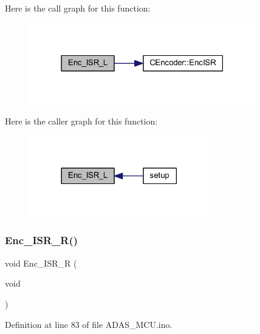 Here is the call graph for this function\+:
\nopagebreak
\begin{figure}[H]
\begin{center}
\leavevmode
\includegraphics[width=279pt]{_a_d_a_s___m_c_u_8ino_a89c135c3ad9390c0a5c08c78a9c985d1_cgraph}
\end{center}
\end{figure}
Here is the caller graph for this function\+:
\nopagebreak
\begin{figure}[H]
\begin{center}
\leavevmode
\includegraphics[width=222pt]{_a_d_a_s___m_c_u_8ino_a89c135c3ad9390c0a5c08c78a9c985d1_icgraph}
\end{center}
\end{figure}
\mbox{\label{_a_d_a_s___m_c_u_8ino_a13fba9b7b9c02542e403a1142b5ad344}} 
\subsubsection{\texorpdfstring{Enc\+\_\+\+I\+S\+R\+\_\+\+R()}{Enc\_ISR\_R()}}
{\footnotesize\ttfamily void Enc\+\_\+\+I\+S\+R\+\_\+R (\begin{DoxyParamCaption}\item[{void}]{ }\end{DoxyParamCaption})}



Definition at line 83 of file A\+D\+A\+S\+\_\+\+M\+C\+U.\+ino.

